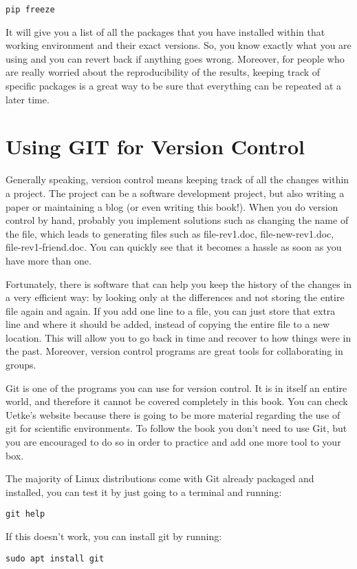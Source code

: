 \begin{verbatim}
pip freeze
\end{verbatim}

It will give you a list of all the packages that you have installed within that working environment and their exact versions. So, you know exactly what you are using and you can revert back if anything goes wrong. Moreover, for people who are really worried about the reproducibility of the results, keeping track of specific packages is a great way to be sure that everything can be repeated at a later time.

\section{Using GIT for Version Control}
Generally speaking, version control means keeping track of all the changes within a project. The project can be a software development project, but also writing a paper or maintaining a blog (or even writing this book!). When you do version control by hand, probably you implement solutions such as changing the name of the file, which leads to generating files such as file-rev1.doc, file-new-rev1.doc, file-rev1-friend.doc. You can quickly see that it becomes a hassle as soon as you have more than one.

Fortunately, there is software that can help you keep the history of the changes in a very efficient way: by looking only at the differences and not storing the entire file again and again. If you add one line to a file, you can just store that extra line and where it should be added, instead of copying the entire file to a new location. This will allow you to go back in time and recover to how things were in the past. Moreover, version control programs are great tools for collaborating in groups.

Git is one of the programs you can use for version control. It is in itself an entire world, and therefore it cannot be covered completely in this book. You can check Uetke’s website because there is going to be more material regarding the use of git for scientific environments. To follow the book you don’t need to use Git, but you are encouraged to do so in order to practice and add one more tool to your box.

The majority of Linux distributions come with Git already packaged and installed, you can test it by just going to a terminal and running:
\begin{verbatim}
git help
\end{verbatim}
If this doesn’t work, you can install git by running:
\begin{verbatim}
sudo apt install git
\end{verbatim}

